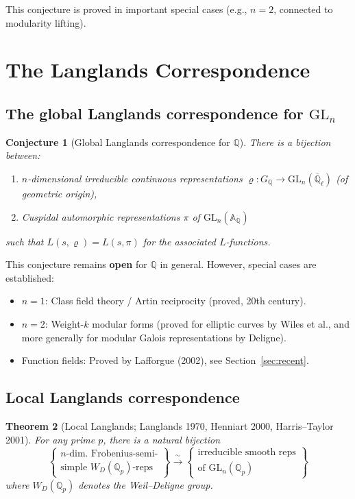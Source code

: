 \documentclass[a4paper,12pt]{amsart}
\newtheorem{theorem}{Theorem}[section]
\newtheorem{conjecture}[theorem]{Conjecture}
\theoremstyle{definition}
\theoremstyle{remark}
\newcommand{\Q}{\mathbb{Q}}
\newcommand{\GL}{\mathrm{GL}}
\begin{document}
This conjecture is proved in important special cases (e.g., $n = 2$, connected to
modularity lifting).

\section{The Langlands Correspondence}
\label{sec:langlands}

\subsection{The global Langlands correspondence for $\GL_n$}

\begin{conjecture}[Global Langlands correspondence for $\Q$]
\label{conj:langlands}
There is a bijection between:
\begin{enumerate}[label=(\roman*)]
\item $n$-dimensional irreducible continuous representations
  $\varrho\colon G_\Q \to \GL_n(\overline{\Q}_\ell)$ (of geometric origin),
\item Cuspidal automorphic representations $\pi$ of $\GL_n(\mathbb{A}_\Q)$
\end{enumerate}
such that $L(s, \varrho) = L(s, \pi)$ for the associated $L$-functions.
\end{conjecture}

This conjecture remains \textbf{open} for $\Q$ in general. However, special cases
are established:

\begin{itemize}
\item $n = 1$: Class field theory / Artin reciprocity (proved, 20th century).
\item $n = 2$: Weight-$k$ modular forms (proved for elliptic curves by Wiles et al.,
  and more generally for modular Galois representations by Deligne).
\item Function fields: Proved by Lafforgue (2002), see Section~\ref{sec:recent}.
\end{itemize}

\subsection{Local Langlands correspondence}

\begin{theorem}[Local Langlands; Langlands 1970, Henniart 2000, Harris--Taylor 2001]
\label{thm:local-langlands}
For any prime $p$, there is a natural bijection
\[
  \left\{
    \begin{array}{c}
      n\text{-dim. Frobenius-semi-}\\ \text{simple } W_{D}(\Q_p)\text{-reps}
    \end{array}
  \right\}
  \xrightarrow{\;\sim\;}
  \left\{
    \begin{array}{c}
      \text{irreducible smooth reps}\\ \text{of } \GL_n(\Q_p)
    \end{array}
  \right\}
\]
where $W_D(\Q_p)$ denotes the Weil--Deligne group.
\end{theorem}
\end{document}
